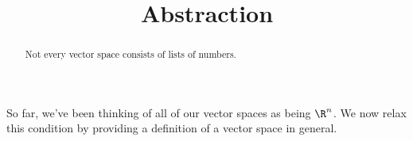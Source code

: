 \documentclass{ximera}
\title{Abstraction}
\begin{document}
\begin{abstract}
  Not every vector space consists of lists of numbers.
\end{abstract}\maketitle

So far, we've been thinking of all of our vector spaces as being
$\R^n$.  We now relax this condition by providing a definition of a
vector space in general.
\end{document}
